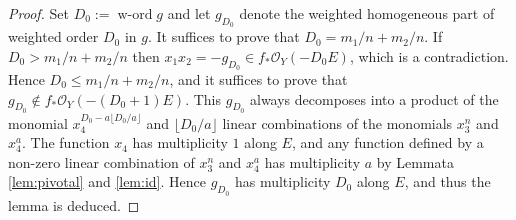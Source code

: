 \documentclass[a4paper,11pt]{amsart}
\theoremstyle{definition}
\theoremstyle{remark}
\numberwithin{equation}{section}
\newcommand{\cO}{{\mathcal O}}
\newcommand{\word}{\operatorname{w\textrm{-}ord}}
\newcommand{\rd}[1]{\lfloor{#1}\rfloor}
\begin{document}
\begin{proof}
Set $D_0:=\word g$
and let $g_{D_0}$ denote the weighted homogeneous part
of weighted order $D_0$ in $g$.
It suffices to prove that $D_0=m_1/n+m_2/n$.
If $D_0>m_1/n+m_2/n$ then $x_1x_2=-g_{D_0} \in f_*\cO_Y(-D_0E)$,
which is a contradiction.
Hence $D_0\le m_1/n+m_2/n$,
and it suffices to prove that $g_{D_0} \not\in f_*\cO_Y(-(D_0+1)E)$.
This $g_{D_0}$ always decomposes into a product of
the monomial $x_4^{D_0-a\rd{D_0/a}}$ and
$\rd{D_0/a}$ linear combinations of the monomials $x_3^n$ and $x_4^a$.
The function $x_4$ has multiplicity $1$ along $E$,
and any function defined by a non-zero linear combination of
$x_3^n$ and $x_4^a$ has multiplicity $a$
by Lemmata \ref{lem:pivotal} and \ref{lem:id}.
Hence $g_{D_0}$ has multiplicity $D_0$ along $E$,
and thus the lemma is deduced.
\end{proof}
\end{document}
